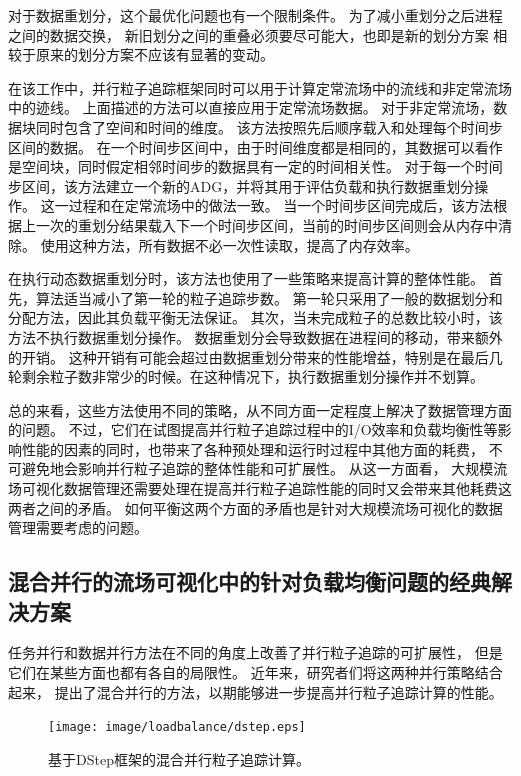 对于数据重划分，这个最优化问题也有一个限制条件。
为了减小重划分之后进程之间的数据交换，
新旧划分之间的重叠必须要尽可能大，也即是新的划分方案
相较于原来的划分方案不应该有显著的变动。

在该工作中，并行粒子追踪框架同时可以用于计算定常流场中的流线和非定常流场中的迹线。
上面描述的方法可以直接应用于定常流场数据。
对于非定常流场，数据块同时包含了空间和时间的维度。
该方法按照先后顺序载入和处理每个时间步区间的数据。
在一个时间步区间中，由于时间维度都是相同的，其数据可以看作是空间块，同时假定相邻时间步的数据具有一定的时间相关性。
对于每一个时间步区间，该方法建立一个新的ADG，并将其用于评估负载和执行数据重划分操作。
这一过程和在定常流场中的做法一致。
当一个时间步区间完成后，该方法根据上一次的重划分结果载入下一个时间步区间，当前的时间步区间则会从内存中清除。
使用这种方法，所有数据不必一次性读取，提高了内存效率。

在执行动态数据重划分时，该方法也使用了一些策略来提高计算的整体性能。
首先，算法适当减小了第一轮的粒子追踪步数。
第一轮只采用了一般的数据划分和分配方法，因此其负载平衡无法保证。
其次，当未完成粒子的总数比较小时，该方法不执行数据重划分操作。
数据重划分会导致数据在进程间的移动，带来额外的开销。
这种开销有可能会超过由数据重划分带来的性能增益，特别是在最后几轮剩余粒子数非常少的时候。在这种情况下，执行数据重划分操作并不划算。

总的来看，这些方法使用不同的策略，从不同方面一定程度上解决了数据管理方面的问题。
不过，它们在试图提高并行粒子追踪过程中的I/O效率和负载均衡性等影响性能的因素的同时，也带来了各种预处理和运行时过程中其他方面的耗费，
不可避免地会影响并行粒子追踪的整体性能和可扩展性。
从这一方面看，
大规模流场可视化数据管理还需要处理在提高并行粒子追踪性能的同时又会带来其他耗费这两者之间的矛盾。
如何平衡这两个方面的矛盾也是针对大规模流场可视化的数据管理需要考虑的问题。

\subsection{混合并行的流场可视化中的针对负载均衡问题的经典解决方案}
任务并行和数据并行方法在不同的角度上改善了并行粒子追踪的可扩展性，
但是它们在某些方面也都有各自的局限性。%
近年来，研究者们将这两种并行策略结合起来，
提出了混合并行的方法，以期能够进一步提高并行粒子追踪计算的性能。
 
 
\begin{figure}[!tb]
  \centering
  \texttt{[image: image/loadbalance/dstep.eps]}
  \caption{
    基于DStep框架的混合并行粒子追踪计算\parencite{KendallWAPHE11}。
  }
  \label{fig:background:dstep}
\end{figure}

